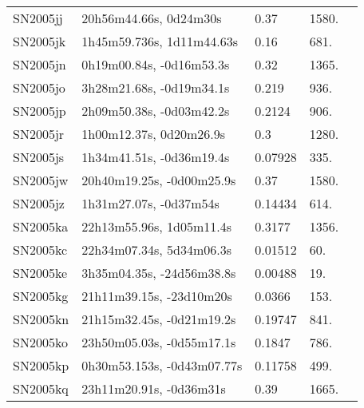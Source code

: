 \begin{longtable}{lllll}
         SN2005jj &         20h56m44.66s, 0d24m30s &     0.37 &          1580. &    \citet{2005CBET..280A...1B} \\
         SN2005jk &      1h45m59.736s, 1d11m44.63s &     0.16 &           681. &    \citet{2005CBET..280A...1B} \\
         SN2005jn &       0h19m00.84s, -0d16m53.3s &     0.32 &          1365. &    \citet{2005CBET..280A...1B} \\
         SN2005jo &       3h28m21.68s, -0d19m34.1s &    0.219 &           936. &    \citet{2011ApJ...740...92G} \\
         SN2005jp &       2h09m50.38s, -0d03m42.2s &   0.2124 &           906. &    \citet{2011ApJ...740...92G} \\
         SN2005jr &        1h00m12.37s, 0d20m26.9s &      0.3 &          1280. &    \citet{2005CBET..280A...1B} \\
         SN2005js &       1h34m41.51s, -0d36m19.4s &  0.07928 &           335. &    \citet{2016SDSSD.C...0000:} \\
         SN2005jw &      20h40m19.25s, -0d00m25.9s &     0.37 &          1580. &    \citet{2005CBET..280A...1B} \\
         SN2005jz &         1h31m27.07s, -0d37m54s &  0.14434 &           614. &    \citet{2004SDSS2.C...0000:} \\
         SN2005ka &       22h13m55.96s, 1d05m11.4s &   0.3177 &          1356. &    \citet{2011ApJ...740...92G} \\
         SN2005kc &       22h34m07.34s, 5d34m06.3s &  0.01512 &            60. &    \citet{1991RC3.9.C...0000d} \\
         SN2005ke &      3h35m04.35s, -24d56m38.8s &  0.00488 &            19. &    \citet{2004AJ....128...16K} \\
         SN2005kg &       21h11m39.15s, -23d10m20s &   0.0366 &           153. &    \citet{1998AJ....116....1D} \\
         SN2005kn &      21h15m32.45s, -0d21m19.2s &  0.19747 &           841. &    \citet{2004SDSS2.C...0000:} \\
         SN2005ko &      23h50m05.03s, -0d55m17.1s &   0.1847 &           786. &    \citet{2011ApJ...740...92G} \\
         SN2005kp &     0h30m53.153s, -0d43m07.77s &  0.11758 &           499. &    \citet{2016SDSSD.C...0000:} \\
         SN2005kq &        23h11m20.91s, -0d36m31s &     0.39 &          1665. &    \citet{2005CBET..304A...1B} \\

\end{longtable}

